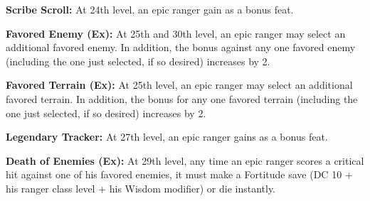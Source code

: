 \textbf{Scribe Scroll:} At 24th level, an epic ranger gain  as a bonus feat.

\textbf{Favored Enemy (Ex):} At 25th and 30th level, an epic ranger may select an additional favored enemy. In addition, the bonus against any one favored enemy (including the one just selected, if so desired) increases by 2.

\textbf{Favored Terrain (Ex):} At 25th level, an epic ranger may select an additional favored terrain. In addition, the bonus for any one favored terrain (including the one just selected, if so desired) increases by 2.

\textbf{Legendary Tracker:} At 27th level, an epic ranger gains  as a bonus feat.

\textbf{Death of Enemies (Ex):} At 29th level, any time an epic ranger scores a critical hit against one of his favored enemies, it must make a Fortitude save (DC 10 + \onehalf his ranger class level + his Wisdom modifier) or die instantly.
